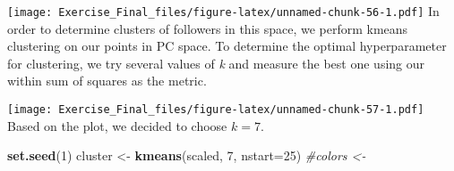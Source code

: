 \documentclass[
]{article}
\newenvironment{Shaded}{\begin{snugshade}}{\end{snugshade}}
\newcommand{\CommentTok}[1]{\textcolor[rgb]{0.56,0.35,0.01}{\textit{#1}}}
\newcommand{\ControlFlowTok}[1]{\textcolor[rgb]{0.13,0.29,0.53}{\textbf{#1}}}
\newcommand{\DataTypeTok}[1]{\textcolor[rgb]{0.13,0.29,0.53}{#1}}
\newcommand{\DecValTok}[1]{\textcolor[rgb]{0.00,0.00,0.81}{#1}}
\newcommand{\KeywordTok}[1]{\textcolor[rgb]{0.13,0.29,0.53}{\textbf{#1}}}
\newcommand{\NormalTok}[1]{#1}
\newcommand{\OperatorTok}[1]{\textcolor[rgb]{0.81,0.36,0.00}{\textbf{#1}}}
\newcommand{\StringTok}[1]{\textcolor[rgb]{0.31,0.60,0.02}{#1}}
\begin{document}
\texttt{[image: Exercise\_Final\_files/figure-latex/unnamed-chunk-56-1.pdf]}
In order to determine clusters of followers in this space, we perform
kmeans clustering on our points in PC space. To determine the optimal
hyperparameter for clustering, we try several values of \emph{k} and
measure the best one using our within sum of squares as the metric.

\begin{Shaded}
\end{Shaded}

\texttt{[image: Exercise\_Final\_files/figure-latex/unnamed-chunk-57-1.pdf]}
Based on the plot, we decided to choose \(k=7\).

\begin{Shaded}
\begin{Highlighting}[]
\KeywordTok{set.seed}\NormalTok{(}\DecValTok{1}\NormalTok{)}
\NormalTok{cluster <-}\StringTok{ }\KeywordTok{kmeans}\NormalTok{(scaled, }\DecValTok{7}\NormalTok{, }\DataTypeTok{nstart=}\DecValTok{25}\NormalTok{)}
\CommentTok{#colors <- }
\end{Highlighting}
\end{Shaded}
\end{document}
